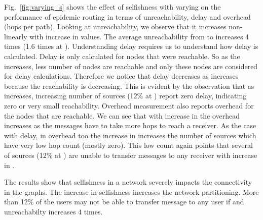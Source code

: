 \documentclass[10pt,conference]{IEEEtran}
\begin{document}
Fig.~\ref{fig:varying_s} shows the effect of selfishness with varying  on the performance of epidemic routing in terms of unreachability, delay and overhead (hops per path). Looking at unreachability, we observe that it increases non-linearly  with increase in  values. The average unreachability from   to   increases 4 times (1.6 times at ). Understanding delay requires us to understand how delay is calculated. Delay is only calculated for nodes that were reachable. So as the  increases, less number of nodes are reachable and only these nodes are considered for delay calculations. Therefore we notice that delay decreases as  increases because the reachability is decreasing. This is evident by the observation that as  increases, increasing number of sources (12\% at ) report zero delay, indicating zero or very small reachability. Overhead measurement also reports overhead for the nodes that are reachable. We can see that with increase in  the overhead increases as the messages have to take  more hops to reach a receiver. As the case with delay, in overhead too the increase in  increases the number of sources which have very low hop count (mostly zero). This low count again points that several of sources (12\% at ) are unable to transfer messages to any receiver with increase in .

The results show that selfishness in a network severely impacts the connectivity in the graphs. The increase in selfishness increases the network partitioning. More than 12\% of the users may not be able to transfer message to any user if  and unreachabilty increases 4 times. 



\begin{figure*}
  \begin{center}
\renewcommand{\thesubfigure}{\Alph{subfigure}.}

    \centering
    

    \caption{Unreachability, Delay  and Overhead at several S and T=0\%, during trace period of Nov 2007}
    \label{fig:varying_s}
  \end{center}
\end{figure*}
\end{document}
